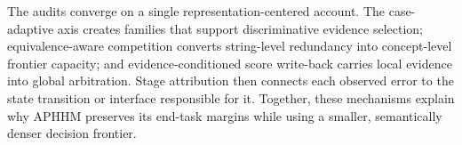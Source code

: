 \documentclass[letterpaper]{article}
\begin{document}
The audits converge on a single representation-centered account.
The case-adaptive axis creates families that support discriminative evidence selection; equivalence-aware competition converts string-level redundancy into concept-level frontier capacity; and evidence-conditioned score write-back carries local evidence into global arbitration.
Stage attribution then connects each observed error to the state transition or interface responsible for it.
Together, these mechanisms explain why APHHM preserves its end-task margins while using a smaller, semantically denser decision frontier.


\end{document}
